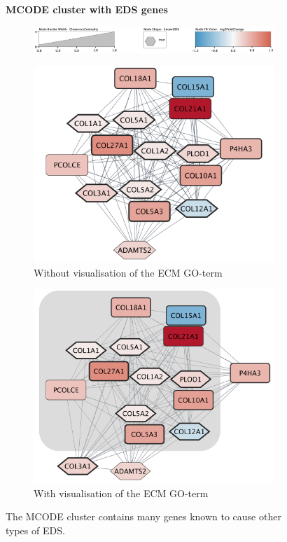 \begin{figure}[htb!]
	\centering
	\caption*{\textbf{MCODE cluster with EDS genes}}
	 \begin{subfigure}{0.8\textwidth}
 		\centering
 		\includegraphics[width=\textwidth]{fig/mcode-legend.png}
 		\vspace{0.2cm}
 	\end{subfigure}
	\begin{subfigure}{.49\textwidth}
		\centering
 		\includegraphics[width=\textwidth]{fig/mcode-cluster-without-enrichment.png}
 			\caption{Without visualisation of the ECM GO-term}
 	\end{subfigure}
 	\begin{subfigure}{.49\textwidth}
 		\centering
 		\includegraphics[width=\textwidth]{fig/mcode-cluster-eds-genes-with-ecm.png}
 		\caption{With visualisation of the ECM GO-term}
 	\end{subfigure}
	\caption[MCODE cluster with EDS genes]{\centering The MCODE cluster contains many genes known to cause other types of EDS.}
	\label{fig:mcode3}
\end{figure}

